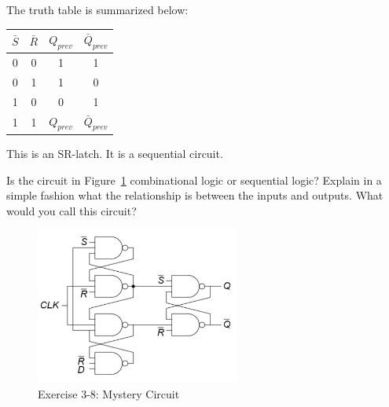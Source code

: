 \documentclass[12pt]{article}
\newenvironment{ex}[2][Exercise]{\begin{trivlist}
		\item[\hskip \labelsep {\bfseries #1}\hskip \labelsep {\bfseries #2.}]}{\end{trivlist}}
\newenvironment{sol}[1][Solution]{\begin{trivlist}
		\item[\hskip \labelsep {\bfseries #1:}]}{\end{trivlist}}
\begin{document}
\begin{sol}
\begin{itemize}
	\end{itemize}
	The truth table is summarized below:
	\begin{center}
		\begin{tabular}{cc|cc}
			$\bar{S}$ & $\bar{R}$ & $Q_{prev}$ & $\bar{Q}_{prev}$\\
			\hline
			0 & 0 & 1 & 1\\
			0 & 1 & 1 & 0\\
			1 & 0 & 0 & 1\\
			1 & 1 & $Q_{prev}$ & $\bar{Q}_{prev}$
		\end{tabular}
	\end{center}
	This is an SR-latch. It is a sequential circuit.
\end{sol}

\begin{ex}{3.8}
	Is the circuit in Figure~\ref{03-08-circuit} combinational logic or sequential logic? Explain in a simple
	fashion what the relationship is between the inputs and outputs. What would you call this
	circuit?
	\begin{figure}[h]
		\centering
		\includegraphics[width=0.6\textwidth]{03-08-circuit}
		\caption{Exercise 3-8: Mystery Circuit}
		\label{03-08-circuit}
	\end{figure}
\end{ex}
\end{document}
